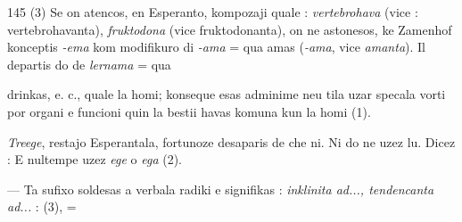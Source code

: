 \begin{VUpage}[149]{145}
{(3) Se on atencos, en Esperanto, kompozaji quale : \textit{vertebrohava}\nl
(vice : vertebrohavanta), \textit{fruktodona} (vice fruktodonanta), on ne\nl
astonesos, ke Zamenhof konceptis \textit{-ema} kom modifikuro di \textit{-ama} =\nl
qua amas (\textit{-ama}, vice \textit{amanta}). Il departis do de \textit{lernama} = qua%
}

\VUcontinue
drinkas, e. c., quale la homi; konseque esas adminime neu\cc
tila uzar specala vorti por organi e funcioni quin la bestii\nl
havas komuna kun la homi (1).

\textit{Treege}, restajo Esperantala, fortunoze desaparis de che ni.\nl
Ni do ne uzez lu. Dicez : \nl
{}\nl
E nultempe uzez \textit{ege} o \textit{ega} (2).

 --- Ta sufixo soldesas a verbala radiki e signifikas :\nl
\textit{inklinita ad..., tendencanta ad...} :  (3),  =
\end{VUpage}

